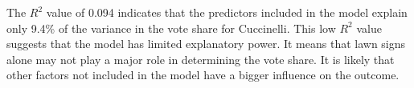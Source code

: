 \documentclass[12pt,letterpaper]{article}
\begin{document}
\begin{enumerate}
	\vspace{0.5cm}
	The $R^2$ value of 0.094 indicates that the predictors included in the model explain only 9.4\% of the variance in the vote share for Cuccinelli. This low $R^2$ value suggests that the model has limited explanatory power. It means that lawn signs alone may not play a major role in determining the vote share. It is likely that other factors not included in the model have a bigger influence on the outcome.
	

	
\end{enumerate}  
\end{document}
